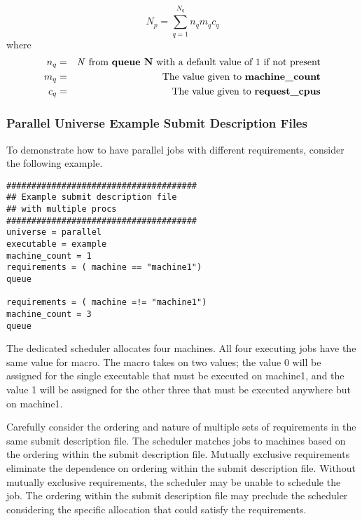 \begin{equation}
  \label{eq:sum-number-of-cpus}
  N_{p} = \sum^{N_q}_{q=1} n_q m_q c_q
\end{equation}
where
\begin{eqnarray*}
  \label{eq:explanation-of-sum-number-of-cpus}
  n_q & = & \textrm{\mbox{\textit{N}} from \textbf{queue N} with a default value of 1 
if not present} \\
  m_q & = & \textrm{The value given to \textbf{machine\_count}} \\
  c_q & = & \textrm{The value given to \textbf{request\_cpus}}
\end{eqnarray*}


\subsubsection{Parallel Universe Example Submit Description Files}

To demonstrate how to have parallel jobs with different requirements,
consider the following example.

\begin{verbatim}
######################################
## Example submit description file
## with multiple procs
######################################
universe = parallel
executable = example
machine_count = 1
requirements = ( machine == "machine1")
queue

requirements = ( machine =!= "machine1")
machine_count = 3
queue
\end{verbatim}

The dedicated scheduler allocates four machines.
All four executing jobs have the same value for 
macro.
The  macro takes on two values;
the value 0 will be assigned for the single executable
that must be executed on machine1, and
the value 1 will be assigned for the other three 
that must be executed anywhere but on machine1.

Carefully consider the ordering and nature of multiple
sets of requirements in the same submit description file.
The scheduler matches jobs to machines based on the ordering
within the submit description file.
Mutually exclusive requirements eliminate the dependence on
ordering within the submit description file.
Without mutually exclusive requirements,
the scheduler may be unable to schedule the job.
The ordering within the submit description file may preclude
the scheduler considering the specific allocation that
could satisfy the requirements.

